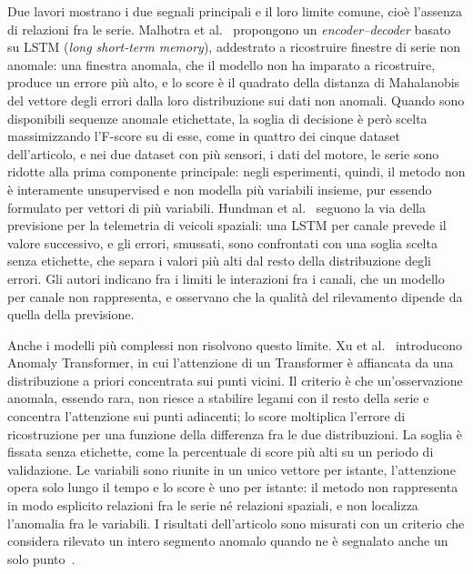 Due lavori mostrano i due segnali principali e il loro limite comune, cioè l'assenza di relazioni fra le serie. Malhotra et al.~\cite{malhotra2016lstm} propongono un \emph{encoder--decoder} basato su LSTM (\emph{long short-term memory}), addestrato a ricostruire finestre di serie non anomale: una finestra anomala, che il modello non ha imparato a ricostruire, produce un errore più alto, e lo score è il quadrato della distanza di Mahalanobis del vettore degli errori dalla loro distribuzione sui dati non anomali. Quando sono disponibili sequenze anomale etichettate, la soglia di decisione è però scelta massimizzando l'F-score su di esse, come in quattro dei cinque dataset dell'articolo, e nei due dataset con più sensori, i dati del motore, le serie sono ridotte alla prima componente principale: negli esperimenti, quindi, il metodo non è interamente unsupervised e non modella più variabili insieme, pur essendo formulato per vettori di più variabili. Hundman et al.~\cite{hundman2018detecting} seguono la via della previsione per la telemetria di veicoli spaziali: una LSTM per canale prevede il valore successivo, e gli errori, smussati, sono confrontati con una soglia scelta senza etichette, che separa i valori più alti dal resto della distribuzione degli errori. Gli autori indicano fra i limiti le interazioni fra i canali, che un modello per canale non rappresenta, e osservano che la qualità del rilevamento dipende da quella della previsione.

Anche i modelli più complessi non risolvono questo limite. Xu et al.~\cite{xu2022anomalytransformer} introducono Anomaly Transformer, in cui l'attenzione di un Transformer è affiancata da una distribuzione a priori concentrata sui punti vicini. Il criterio è che un'osservazione anomala, essendo rara, non riesce a stabilire legami con il resto della serie e concentra l'attenzione sui punti adiacenti; lo score moltiplica l'errore di ricostruzione per una funzione della differenza fra le due distribuzioni. La soglia è fissata senza etichette, come la percentuale di score più alti su un periodo di validazione. Le variabili sono riunite in un unico vettore per istante, l'attenzione opera solo lungo il tempo e lo score è uno per istante: il metodo non rappresenta in modo esplicito relazioni fra le serie né relazioni spaziali, e non localizza l'anomalia fra le variabili. I risultati dell'articolo sono misurati con un criterio che considera rilevato un intero segmento anomalo quando ne è segnalato anche un solo punto~\cite{xu2022anomalytransformer}.



